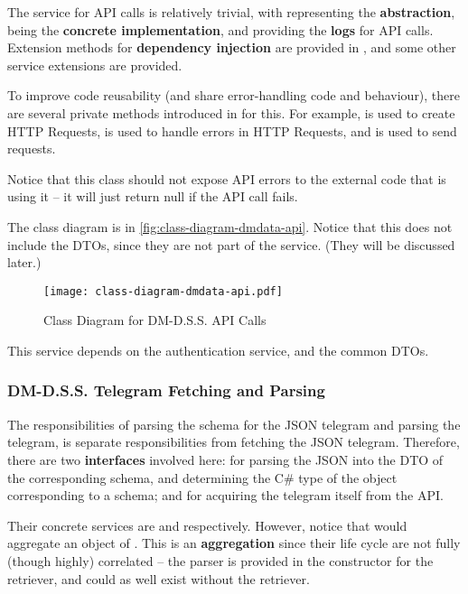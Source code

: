 The service for API calls is relatively trivial, with  representing the \textbf{abstraction},  being the \textbf{concrete implementation}, and  providing the \textbf{logs} for API calls. Extension methods for \textbf{dependency injection} are provided in , and some other service extensions are provided.

To improve code reusability (and share error-handling code and behaviour), there are several private methods introduced in  for this. For example,  is used to create HTTP Requests,  is used to handle errors in HTTP Requests, and  is used to send requests.

Notice that this class should not expose API errors to the external code that is using it -- it will just return null if the API call fails.

The class diagram is in \autoref{fig:class-diagram-dmdata-api}. Notice that this does not include the DTOs, since they are not part of the service. (They will be discussed later.)

\begin{figure}[htp]
    \centering
    \texttt{[image: class-diagram-dmdata-api.pdf]}
    \caption{Class Diagram for DM-D.S.S. API Calls}
    \label{fig:class-diagram-dmdata-api}
\end{figure}

This service depends on the authentication service, and the common DTOs.

\subsubsection{DM-D.S.S. Telegram Fetching and Parsing}

The responsibilities of parsing the schema for the JSON telegram and parsing the telegram, is separate responsibilities from fetching the JSON telegram. Therefore, there are two \textbf{interfaces} involved here:  for parsing the JSON into the DTO of the corresponding schema, and determining the C\# type of the object corresponding to a schema; and  for acquiring the telegram itself from the API.

Their concrete services are  and  respectively. However, notice that  would aggregate an object of . This is an \textbf{aggregation} since their life cycle are not fully (though highly) correlated -- the parser is provided in the constructor for the retriever, and could as well exist without the retriever.

